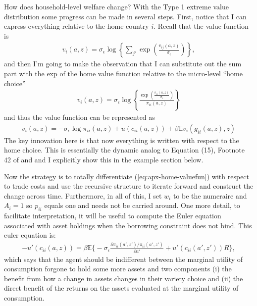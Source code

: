 \documentclass[12pt,pdftex]{article}
\begin{document}
\begin{onehalfspacing}
How does household-level welfare change? With the Type 1 extreme value distribution some progress can be made in several steps. First, notice that I can  express everything relative to the home country $i$. Recall that the value function is
\begin{align}
v_i(a, z) =  \sigma_{\epsilon} \log \left\{ \sum_{j'} \exp \left( \frac{  v_{ij}(a, z)}{\sigma_{\epsilon}} \right) \right\},
\end{align}
and then I'm going to make the observation that I can substitute out the sum part with the exp of the home value function relative to the micro-level ``home choice''
\begin{align}
v_i(a, z) =  \sigma_{\epsilon} \log \left\{ \frac{ \exp \left( \frac{  v_{ii}(a, z)}{\sigma_{\epsilon}}\right )}{\pi_{ii}(a,z)}  \right\}
\end{align}
and thus the value function can be represented as
\begin{align}
v_i(a, z) = -\sigma_{\epsilon} \log \pi_{ii}(a,z) + u(c_{ii}(a,z)) + \beta \mathbb{E} v_{i}(g_{ii}(a,z),z)
\label{eq:apx-home-valuefun}
\end{align}
The key innovation here is that now everything is written with respect to the home choice. This is essentially the dynamic analog to Equation (15), Footnote 42 of \citet{eaton2002technology} and \citet{arkolakis2012new} and I explicitly show this in the example section below. 

Now the strategy is to totally differentiate (\ref{eq:apx-home-valuefun}) with respect to trade costs and use the recursive structure to iterate forward and construct the change across time. Furthermore, in all of this, I set $w_i$ to be the numeraire and $A_i = 1$ so $p_{ii}$ equals one and needs not be carried around. One more detail, to facilitate interpretation, it will be useful to compute the Euler equation associated with asset holdings when the borrowing constraint does not bind. This euler equation is:
\begin{align}
-u'(c_{ii}(a,z)) = \beta \mathbb{E} \bigg \{ -\sigma_{\epsilon} \frac{\partial \pi_{ii}(a',z') / \pi_{ii}(a',z')}{\partial a'} + u'(c_{ii}(a',z'))R \bigg \},
\end{align}
which says that the agent should be indifferent between the marginal utility of consumption forgone to hold some more assets and two components (i) the benefit from how a change in assets changes in their variety choice and (ii) the direct benefit of the returns on the assets evaluated at the marginal utility of consumption. 


\end{onehalfspacing}
\end{document}
